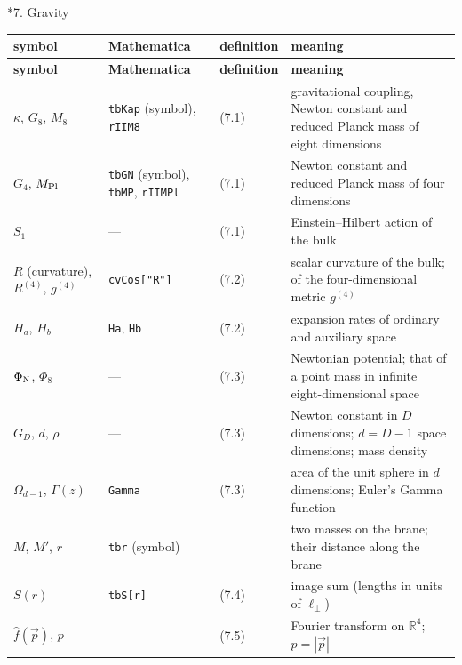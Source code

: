 \documentclass[10pt,a4paper]{article}
\makeatletter
\renewcommand\section{\@startsection{section}{1}{\z@}{-3.5ex \@plus -1ex \@minus -.2ex}{2.3ex \@plus.2ex}{\normalfont\Large\bfseries\raggedright}}
\makeatother
\begin{document}
\section*{7. Gravity}
{\small
\begin{longtable}{>{\raggedright\arraybackslash}p{}>{\raggedright\arraybackslash}p{}>{\raggedright\arraybackslash}p{}>{\raggedright\arraybackslash}p{}}
\toprule
\textbf{symbol} & \textbf{Mathematica} & \textbf{definition} & \textbf{meaning} \\
\midrule\endfirsthead
\toprule
\textbf{symbol} & \textbf{Mathematica} & \textbf{definition} & \textbf{meaning} \\
\midrule\endhead
\endfoot
\bottomrule\endlastfoot
$\kappa$, $G_8$, $M_8$ & \texttt{tbKap} (symbol), \texttt{rIIM8} & (7.1) & gravitational coupling, Newton constant and reduced Planck mass of eight dimensions \\
$G_4$, $M_{\rm Pl}$ & \texttt{tbGN} (symbol), \texttt{tbMP}, \texttt{rIIMPl} & (7.1) & Newton constant and reduced Planck mass of four dimensions \\
$S_1$ & — & (7.1) & Einstein–Hilbert action of the bulk \\
$R$ (curvature), $R^{(4)}$, $g^{(4)}$ & \texttt{cvCos["R"]} & (7.2) & scalar curvature of the bulk; of the four-dimensional metric $g^{(4)}$ \\
$H_a$, $H_b$ & \texttt{Ha}, \texttt{Hb} & (7.2) & expansion rates of ordinary and auxiliary space \\
$\Phi_{\rm N}$, $\Phi_8$ & — & (7.3) & Newtonian potential; that of a point mass in infinite eight-dimensional space \\
$G_D$, $d$, $\rho$ & — & (7.3) & Newton constant in $D$ dimensions; $d=D-1$ space dimensions; mass density \\
$\Omega_{d-1}$, $\Gamma(z)$ & \texttt{Gamma} & (7.3) & area of the unit sphere in $d$ dimensions; Euler’s Gamma function \\
$M$, $M'$, $r$ & \texttt{tbr} (symbol) &  & two masses on the brane; their distance along the brane \\
$S(r)$ & \texttt{tbS[r]} & (7.4) & image sum (lengths in units of $\ell_\perp$) \\
$\hat f(\vec p)$, $p$ & — & (7.5) & Fourier transform on $\mathbb R^4$; $p=|\vec p|$ \\

\end{longtable}}
\end{document}
